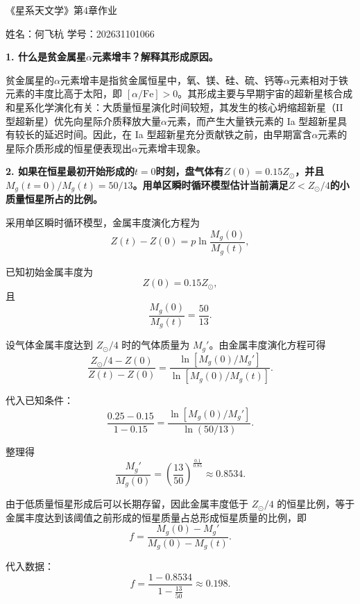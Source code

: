 \documentclass{ctexart}
\begin{document}
\begin{center}
    {\LARGE 《星系天文学》第4章作业}

    \vspace{1em}

    姓名：何飞杭 \qquad 学号：202631101066
\end{center}

\noindent\textbf{1.	什么是贫金属星\(\alpha\)元素增丰？解释其形成原因。}

\vspace{0.25em}

贫金属星的\(\alpha\)元素增丰是指贫金属恒星中，氧、镁、硅、硫、钙等\(\alpha\)元素相对于铁元素的丰度比高于太阳，即 \([\alpha/\mathrm{Fe}]>0\)。其形成主要与早期宇宙的超新星核合成和星系化学演化有关：大质量恒星演化时间较短，其发生的核心坍缩超新星（II 型超新星）优先向星际介质释放大量\(\alpha\)元素，而产生大量铁元素的 Ia 型超新星具有较长的延迟时间。因此，在 Ia 型超新星充分贡献铁之前，由早期富含\(\alpha\)元素的星际介质形成的恒星便表现出\(\alpha\)元素增丰现象。

\vspace{0.5em}

\noindent\textbf{2.	如果在恒星最初开始形成的\(t = 0\)时刻，盘气体有\(Z(0) = 0.15Z_{\odot}\)，并且\(M_g(t = 0)/M_g(t) = 50 / 13\)。用单区瞬时循环模型估计当前满足\(Z < Z_{\odot}/4\)的小质量恒星所占的比例。}

\vspace{0.25em}

采用单区瞬时循环模型，金属丰度演化方程为
\[
Z(t)-Z(0)=p\ln\frac{M_g(0)}{M_g(t)},
\]

已知初始金属丰度为
\[
Z(0)=0.15Z_\odot,
\]
且
\[
\frac{M_g(0)}{M_g(t)}=\frac{50}{13}.
\]

设气体金属丰度达到 \(Z_\odot/4\) 时的气体质量为 \(M_g'\)。由金属丰度演化方程可得
\[
\frac{Z_\odot/4-Z(0)}{Z(t)-Z(0)}
=
\frac{\ln[M_g(0)/M_g']}
{\ln[M_g(0)/M_g(t)]}.
\]

代入已知条件：
\[
\frac{0.25-0.15}{1-0.15}
=
\frac{\ln[M_g(0)/M_g']}
{\ln(50/13)}.
\]

整理得
\[
\frac{M_g'}{M_g(0)}
=
\left(\frac{13}{50}\right)^{\frac{0.1}{0.85}}
\approx 0.8534.
\]

由于低质量恒星形成后可以长期存留，因此金属丰度低于 \(Z_\odot/4\) 的恒星比例，等于金属丰度达到该阈值之前形成的恒星质量占总形成恒星质量的比例，即
\[
f=
\frac{M_g(0)-M_g'}{M_g(0)-M_g(t)}.
\]

代入数据：
\[
f=
\frac{1-0.8534}{1-\frac{13}{50}}
\approx 0.198.
\]

\vspace{0.5em}
\end{document}
